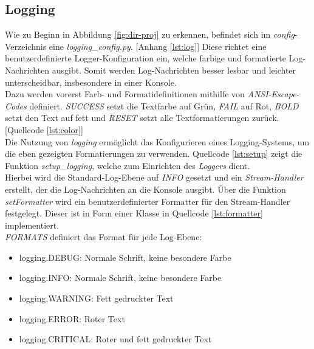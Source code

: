 \subsection{Logging}
Wie zu Beginn in Abbildung \ref{fig:dir-proj} zu erkennen, befindet sich im \textit{config}-Verzeichnis eine \textit{logging\_config.py}. [Anhang \ref{lst:log}] Diese richtet eine benutzerdefinierte Logger-Konfiguration ein, welche farbige und formatierte Log-Nachrichten ausgibt. Somit werden Log-Nachrichten besser lesbar und leichter unterscheidbar, insbesondere in einer Konsole.\\ Dazu werden vorerst Farb- und Formatidefinitionen mithilfe von \textit{ANSI-Escape-Codes} definiert. \textit{SUCCESS} setzt die Textfarbe auf Grün, \textit{FAIL} auf Rot, \textit{BOLD} setzt den Text auf fett und \textit{RESET} setzt alle Textformatierungen zurück. [Quellcode \ref{lst:color}]\\
\vspace{-.3cm}
Die Nutzung von \textit{logging} ermöglicht das Konfigurieren eines Logging-Systems, um die eben gezeigten Formatierungen zu verwenden. Quellcode \ref{lst:setup} zeigt die Funktion \textit{setup\_logging}, welche zum Einrichten des \textit{Loggers} dient. \\
\vspace{-.3cm}Hierbei wird die Standard-Log-Ebene auf \textit{INFO} gesetzt und ein \textit{Stream-Handler} erstellt, der die Log-Nachrichten an die Konsole ausgibt.
Über die Funktion \textit{setFormatter} wird ein benutzerdefinierter Formatter für den Stream-Handler festgelegt. Dieser ist in Form einer Klasse in Quellcode \ref{lst:formatter} implementiert.\\
\vspace{-.3cm}
\textit{FORMATS} definiert das Format für jede Log-Ebene:
\begin{itemize}
    \setlength{\parskip}{1pt}
    \item logging.DEBUG: Normale Schrift, keine besondere Farbe
    \item logging.INFO: Normale Schrift, keine besondere Farbe
    \item logging.WARNING: Fett gedruckter Text
    \item logging.ERROR: Roter Text
    \item logging.CRITICAL: Roter und fett gedruckter Text
\end{itemize}
